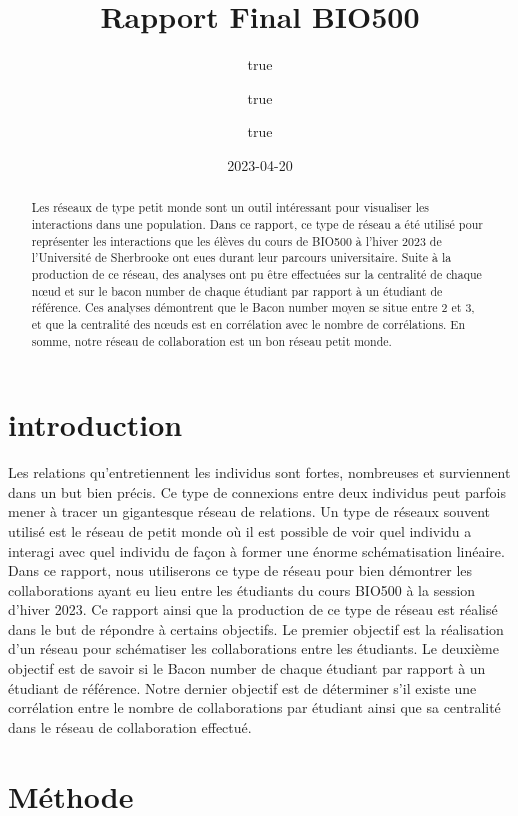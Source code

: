 \documentclass[
]{article}
\title{Rapport Final BIO500}
\author{true \and true \and true}
\date{2023-04-20}
\begin{document}
\maketitle
\begin{abstract}
Les réseaux de type petit monde sont un outil intéressant pour
visualiser les interactions dans une population. Dans ce rapport, ce
type de réseau a été utilisé pour représenter les interactions que les
élèves du cours de BIO500 à l'hiver 2023 de l'Université de Sherbrooke
ont eues durant leur parcours universitaire. Suite à la production de ce
réseau, des analyses ont pu être effectuées sur la centralité de chaque
nœud et sur le bacon number de chaque étudiant par rapport à un étudiant
de référence. Ces analyses démontrent que le Bacon number moyen se situe
entre 2 et 3, et que la centralité des nœuds est en corrélation avec le
nombre de corrélations. En somme, notre réseau de collaboration est un
bon réseau petit monde.
\end{abstract}

\hypertarget{introduction}{%
\section{introduction}\label{introduction}}

Les relations qu'entretiennent les individus sont fortes, nombreuses et
surviennent dans un but bien précis. Ce type de connexions entre deux
individus peut parfois mener à tracer un gigantesque réseau de
relations. Un type de réseaux souvent utilisé est le réseau de petit
monde où il est possible de voir quel individu a interagi avec quel
individu de façon à former une énorme schématisation linéaire. Dans ce
rapport, nous utiliserons ce type de réseau pour bien démontrer les
collaborations ayant eu lieu entre les étudiants du cours BIO500 à la
session d'hiver 2023. Ce rapport ainsi que la production de ce type de
réseau est réalisé dans le but de répondre à certains objectifs. Le
premier objectif est la réalisation d'un réseau pour schématiser les
collaborations entre les étudiants. Le deuxième objectif est de savoir
si le Bacon number de chaque étudiant par rapport à un étudiant de
référence. Notre dernier objectif est de déterminer s'il existe une
corrélation entre le nombre de collaborations par étudiant ainsi que sa
centralité dans le réseau de collaboration effectué.

\hypertarget{muxe9thode}{%
\section{Méthode}\label{muxe9thode}}
\end{document}

